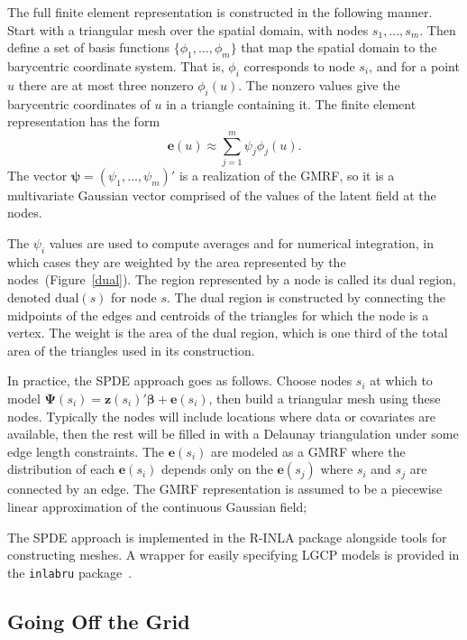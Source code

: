\documentclass[]{interact}
\begin{document}
The full finite element representation is constructed in the following manner.
Start with a triangular mesh over the spatial domain, with nodes
\(s_{1}, \dots, s_{m}\). Then define a set of basis functions
\(\{\phi_{1}, \dots, \phi_{m}\}\) that map the spatial domain to the
barycentric coordinate system. That is, \(\phi_{i}\) corresponds to node
\(s_{i}\), and for a point \(u\) there are at most three nonzero
\(\phi_{i}(u)\). The nonzero values give the barycentric coordinates of \(u\)
in a triangle containing it. The finite element representation has the form
\begin{equation}
\mathbf{e}(u) \approx \sum_{j = 1}^{m} \psi_{j} \phi_{j}(u).
\end{equation}
The vector \(\boldsymbol{\psi} = (\psi_{1}, \dots, \psi_{m})'\) is a
realization of the GMRF, so it is a multivariate Gaussian vector comprised of
the values of the latent field at the nodes.

The \(\psi_{i}\) values are used to compute averages and for numerical
integration, in which cases they are weighted by the area represented by the
nodes~(Figure~\ref{dual}). The region represented by a node is called its dual
region, denoted \(\mathrm{dual}(s)\) for node \(s\). The dual region is
constructed by connecting the midpoints of the edges and centroids of the
triangles for which the node is a vertex. The weight is the area of the dual
region, which is one third of the total area of the triangles used in its
construction.

In practice, the SPDE approach goes as follows. Choose nodes \(s_{i}\)
at which to model \(\boldsymbol{\Psi}(s_{i})
= \mathbf{z}(s_{i})' \boldsymbol{\beta} + \mathbf{e}(s_{i})\), then build a
triangular mesh using these nodes. Typically the nodes will include locations
where data or covariates are available, then the rest will be filled in with a
Delaunay triangulation under some edge length constraints. The
\(\mathbf{e}(s_{i})\) are modeled as a GMRF where the distribution of
each \(\mathbf{e}(s_{i})\) depends only on the
\(\mathbf{e}(s_{j})\) where \(s_{i}\) and \(s_{j}\) are connected by an
edge. The GMRF representation is assumed to be a piecewise linear approximation
of the continuous Gaussian field;

The SPDE approach is implemented in the R-INLA package alongside tools
for constructing meshes. A wrapper for easily specifying LGCP models is
provided in the \texttt{inlabru} package~\cite{inlabru}.


\subsection{Going Off the Grid}
\label{offgrid}
\end{document}
